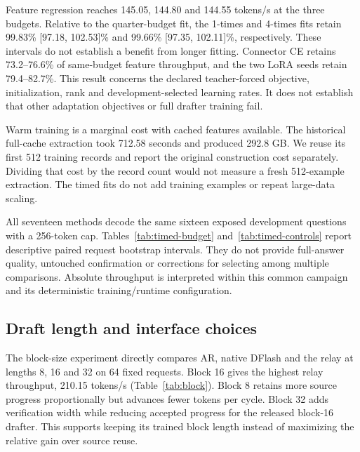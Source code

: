 \documentclass{article}
\begin{document}
\begin{table}[H]
\caption{References measured within the same budget-decoding campaign.
The initial mapper has 128 feature-regression updates. The 8,192-update
reference is an existing saved checkpoint.}
\label{tab:timed-controls}
\centering\footnotesize

\end{table}

Feature regression reaches 145.05, 144.80 and 144.55 tokens/s at the
three budgets. Relative to the quarter-budget fit, the 1-times and
4-times fits retain 99.83\% [97.18, 102.53]\% and 99.66\%
[97.35, 102.11]\%, respectively. These intervals do not establish a
benefit from longer fitting. Connector CE retains 73.2--76.6\% of
same-budget feature throughput, and the two LoRA seeds retain
79.4--82.7\%. This result concerns the declared teacher-forced objective,
initialization, rank and development-selected learning rates. It does not
establish that other adaptation objectives or full drafter training fail.

Warm training is a marginal cost with cached features available. The
historical full-cache extraction took 712.58 seconds and produced
292.8 GB. We reuse its first 512 training records and report the original
construction cost separately. Dividing that cost by the record count
would not measure a fresh 512-example extraction. The timed fits do not
add training examples or repeat large-data scaling.

All seventeen methods decode the same sixteen exposed development
questions with a 256-token cap. Tables~\ref{tab:timed-budget}
and~\ref{tab:timed-controls} report descriptive paired request bootstrap
intervals. They do not provide full-answer quality, untouched confirmation
or corrections for selecting among multiple comparisons. Absolute
throughput is interpreted within this common campaign and its deterministic
training/runtime configuration.

\subsection{Draft length and interface choices}

The block-size experiment directly compares AR, native DFlash and the
relay at lengths 8, 16 and 32 on 64 fixed requests. Block 16 gives the
highest relay throughput, 210.15 tokens/s (Table~\ref{tab:block}). Block 8 retains more source
progress proportionally but advances fewer tokens per cycle. Block 32
adds verification width while reducing accepted progress for the
released block-16 drafter. This supports keeping its trained block length
instead of maximizing the relative gain over source reuse.
\end{document}
